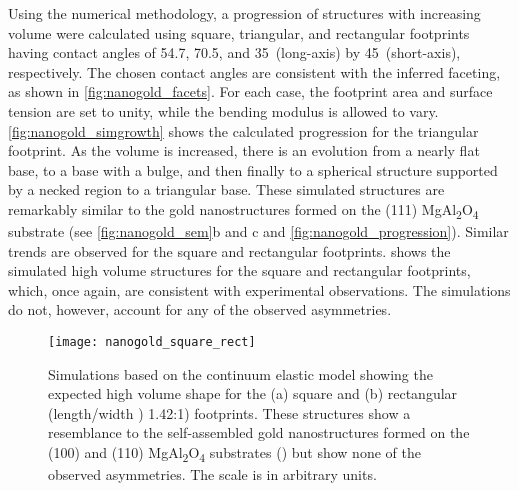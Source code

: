 Using the numerical methodology, a progression of
structures with increasing volume were calculated using
square, triangular, and rectangular footprints having contact
angles of 54.7\degree, 70.5\degree, and 35\degree~(long-axis) by 45\degree~(short-axis),
respectively. The chosen contact angles are consistent with
the inferred faceting, as shown in \cref{fig:nanogold_facets}. For each case,
the footprint area and surface tension are set to unity, while
the bending modulus is allowed to vary. \cref{fig:nanogold_simgrowth} shows the
calculated progression for the triangular footprint. As the
volume is increased, there is an evolution from a nearly flat
base, to a base with a bulge, and then finally to a spherical
structure supported by a necked region to a triangular base.
These simulated structures are remarkably similar to the gold
nanostructures formed on the (111) MgAl\textsubscript{2}O\textsubscript{4} substrate (see
\cref{fig:nanogold_sem}b and c and \cref{fig:nanogold_progression}). Similar trends are observed for the
square and rectangular footprints.  shows the
simulated high volume structures for the square and rectangular footprints, which, once again, are consistent with
experimental observations. The simulations do not, however,
account for any of the observed asymmetries.
\begin{figure}
    \centering
    \texttt{[image: nanogold\_square\_rect]}
    \caption{\label{fig:nanogold_square_rect}Simulations based on the continuum elastic model
        showing the expected high volume shape for the (a) square and
        (b) rectangular (length/width ) 1.42:1) footprints. These structures
        show a resemblance to the self-assembled gold nanostructures
        formed on the (100) and (110) MgAl\textsubscript{2}O\textsubscript{4} substrates () but
        show none of the observed asymmetries. The scale is in arbitrary
        units.}
\end{figure}

